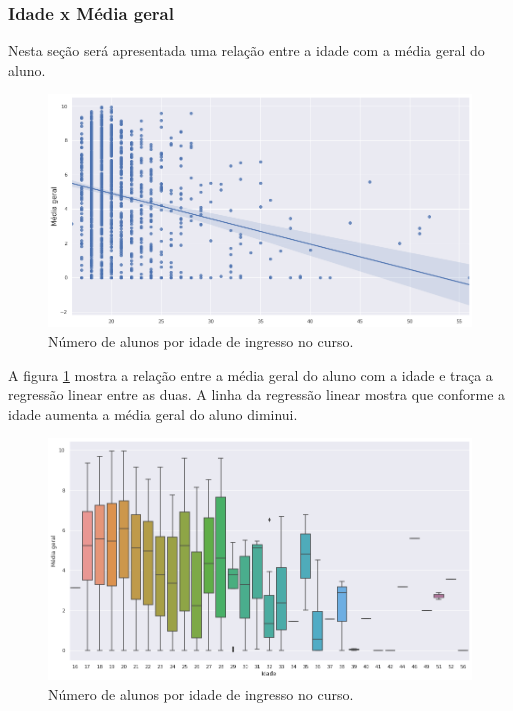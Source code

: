 \documentclass[diss,capa]{texufpel}
\begin{document}
\subsubsection{Idade x Média geral}

Nesta seção será apresentada uma relação entre a idade com a média geral do aluno.

\begin{figure}[htbp]
\centering \includegraphics[scale=.45]{imagens/media-geral-idade.png}
\caption{Número de alunos por idade de ingresso no curso.}
\label{fig:media-geral-idade}
\end{figure}

A figura \ref{fig:media-geral-idade} mostra a relação entre a média geral do aluno com a idade e traça a regressão linear entre as duas.
A linha da regressão linear mostra que conforme a idade aumenta a média geral do aluno diminui.

\begin{figure}[htbp]
\centering \includegraphics[scale=.43]{imagens/media-geral-idade-grafico-quartis.png}
\caption{Número de alunos por idade de ingresso no curso.}
\label{fig:media-geral-idade-grafico-quartis}
\end{figure}
\end{document}
